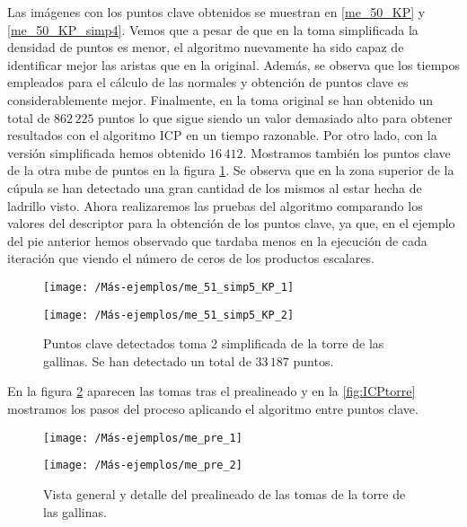 Las imágenes con los puntos clave obtenidos se muestran en \ref{me_50_KP} y \ref{me_50_KP_simp4}. Vemos que a pesar de que en la toma simplificada la densidad de puntos es menor, el algoritmo nuevamente ha sido capaz de identificar mejor las aristas que en la original. Además, se observa que los tiempos empleados para el cálculo de las normales y obtención de puntos clave es considerablemente mejor. Finalmente, en la toma original se han obtenido un total de $ 862\,225 $ puntos lo que sigue siendo un valor demasiado alto para obtener resultados con el algoritmo ICP en un tiempo razonable. Por otro lado, con la versión simplificada hemos obtenido $16\,412 $. Mostramos también los puntos clave de la otra nube de puntos en la figura \ref{me_51_KP_simp4}. Se observa que en la zona superior de la cúpula se han detectado una gran cantidad de los mismos al estar hecha de ladrillo visto. Ahora realizaremos las pruebas del algoritmo comparando los valores del descriptor para la obtención de los puntos clave, ya que, en el ejemplo del pie anterior hemos observado que tardaba menos en la ejecución de cada iteración que viendo el número de ceros de los productos escalares. \\

\begin{figure}[h!]	
	\begin{minipage}[b]{0.5\textwidth}
		\centering		
		\texttt{[image: /Más-ejemplos/me\_51\_simp5\_KP\_1]} 
	\end{minipage}
	\begin{minipage}[b]{0.5\textwidth}
		\texttt{[image: /Más-ejemplos/me\_51\_simp5\_KP\_2]}
	\end{minipage}
	\caption{Puntos clave detectados toma 2 simplificada de la torre de las gallinas. Se han detectado un total de $ 33\,187 $ puntos.}
	\label{me_51_KP_simp4}
\end{figure}

En la figura \ref{fig:ICPtorrePre} aparecen las tomas tras el prealineado y en la \ref{fig:ICPtorre} mostramos los pasos del proceso aplicando el algoritmo entre puntos clave. \\

\begin{figure}[h!]	
	\begin{minipage}[b]{0.5\textwidth}
		\centering		
		\texttt{[image: /Más-ejemplos/me\_pre\_1]} 
	\end{minipage}
	\begin{minipage}[b]{0.5\textwidth}
		\centering
		\texttt{[image: /Más-ejemplos/me\_pre\_2]}
	\end{minipage}
	\caption{Vista general y detalle del prealineado de las tomas de la torre de las gallinas.}
	\label{fig:ICPtorrePre}
\end{figure}

